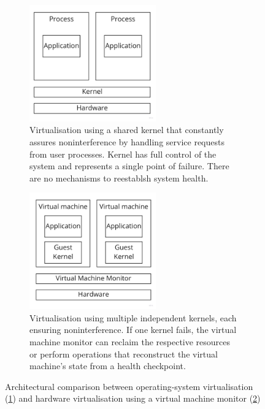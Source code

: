 \begin{figure}
    \centering
        \begin{subfigure}[b]{0.45\textwidth}
            \centering
            \includegraphics[width=0.6\textwidth]{images/fundamentals/kernel-virt-arch.jpg}
            \caption{Virtualisation using a shared kernel that constantly assures noninterference by 
                    handling service requests from user processes. Kernel has full control of the system
                    and represents a single point of failure. There are no mechanisms to reestablsh 
                    system health.}
            \label{images:fundamentals/kernel-virt-arch.jpg}
        \end{subfigure}%
        \hfill
        \begin{subfigure}[b]{0.45\textwidth}
            \centering
            \includegraphics[width=0.6\textwidth]{images/fundamentals/full-virt-arch.jpg}
            \caption{Virtualisation using multiple independent kernels, each ensuring noninterference. 
                    If one kernel fails, the virtual machine monitor can reclaim the respective resources or 
                    perform operations that reconstruct the virtual machine's state from a health checkpoint.}
            \label{images:fundamentals/full-virt-arch.jpg}
        \end{subfigure}
    \caption{Architectural comparison between operating-system virtualisation (\ref{images:fundamentals/kernel-virt-arch.jpg})
             and hardware virtualisation using a virtual machine monitor (\ref{images:fundamentals/full-virt-arch.jpg})}
    \label{images:fundamentals/virt-arch}
\end{figure}

